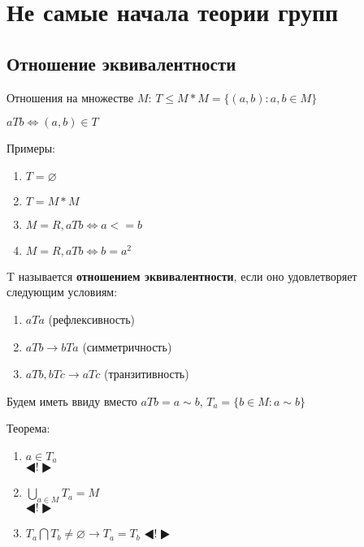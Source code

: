 \documentclass[12pt]{article}
\begin{document}
		
		
		
		
		



		\newpage
		\section{Не самые начала теории групп}
	
		\subsection{Отношение эквивалентности}
		
		Отношения на множестве $M$:
		$T \le M*M=\{(a,b):a,b\in M\}$
		
		$aTb \Leftrightarrow (a,b)\in T$ 
		
		Примеры:
		\begin{enumerate}
			\item $T=\varnothing$
			\item $T=M*M$
			\item $M=R, aTb \Leftrightarrow a<=b$
			\item $M=R, aTb \Leftrightarrow b=a^2$
		\end{enumerate}
		
		T называется \hypertarget{indef:equiv}{\textbf{отношением эквивалентности}}, если оно удовлетворяет следующим условиям:
		\begin{enumerate}
			\item $aTa$ (рефлексивность)
			\item $aTb \rightarrow bTa$ (симметричность)
			\item $aTb, bTc \rightarrow aTc$ (транзитивность)
		\end{enumerate}
		
		Будем иметь ввиду вместо $aTb=a\sim b$, $T_a=\{b\in M:a\sim b\}$
		
		Теорема:
		\begin{enumerate}
			\item $a\in T_a$ \\
				$\LHD ! \RHD$
			\item $\bigcup_{a\in M} T_a=M$ \\
				$\LHD ! \RHD$ \\
			\item $T_a \bigcap T_b \not= \varnothing \rightarrow T_a=T_b$
				$\LHD ! \RHD$ \\
		\end{enumerate}
		
\end{document}
